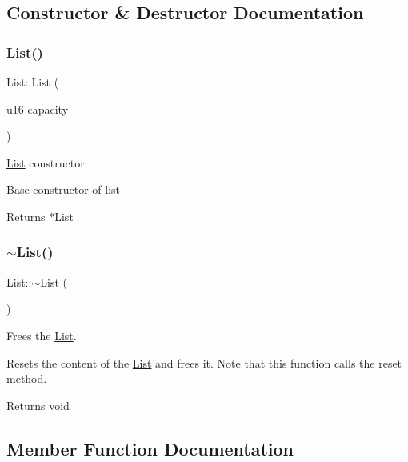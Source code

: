 \subsection{Constructor \& Destructor Documentation}
\mbox{\label{class_list_a65d13ae9c7a02b28980df793dd088ced}} 
\subsubsection{\texorpdfstring{List()}{List()}}
{\footnotesize\ttfamily List\+::\+List (\begin{DoxyParamCaption}\item[{u16}]{capacity }\end{DoxyParamCaption})}



\hyperlink{class_list}{List} constructor. 

Base constructor of list

\begin{DoxyReturn}{Returns}
$\ast$\+List 
\end{DoxyReturn}
\mbox{\label{class_list_a70aecf37bd9d779a394e4d50377fbf5f}} 
\subsubsection{\texorpdfstring{$\sim$\+List()}{~List()}}
{\footnotesize\ttfamily List\+::$\sim$\+List (\begin{DoxyParamCaption}{ }\end{DoxyParamCaption})}



Frees the \hyperlink{class_list}{List}. 

Resets the content of the \hyperlink{class_list}{List} and frees it. Note that this function calls the reset method.

\begin{DoxyReturn}{Returns}
void 
\end{DoxyReturn}


\subsection{Member Function Documentation}
\mbox{\label{class_list_a4802fdf61227c5740868c968dcc7f7b5}} 
